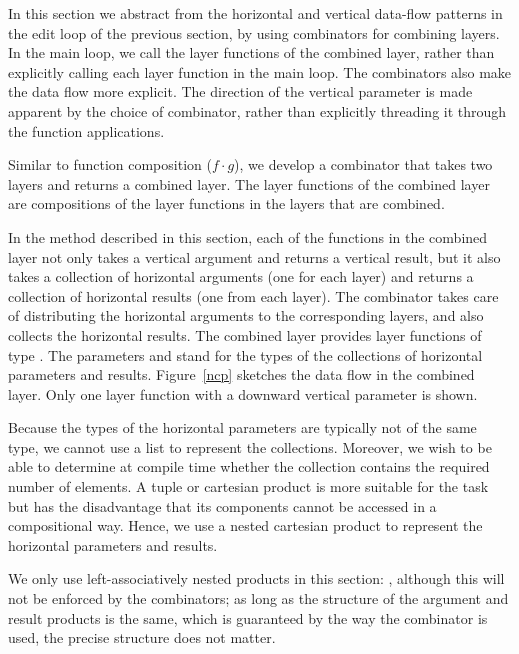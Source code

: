 \documentclass[preprint,natbib]{sigplanconf}
\begin{document}
In this section we abstract from the horizontal and vertical data-flow patterns in the edit loop of the previous section, by using combinators for combining layers. In the main loop, we call the layer functions of the combined layer, rather than explicitly calling each layer function in the main loop. The combinators also make the data flow more explicit. The direction of the vertical parameter is made apparent by the choice of combinator, rather than explicitly threading it through the function applications.

Similar to function composition ($f \cdot g$), we develop a  combinator that takes two layers and returns a combined layer. The layer functions of the combined layer are compositions of the layer functions in the layers that are combined.

In the method described in this section, each of the functions in the combined layer not only takes a vertical argument and returns a vertical result, but it also takes a collection of horizontal arguments (one for each layer) and returns a collection of horizontal results (one from each layer). The  combinator takes care of distributing the horizontal arguments to the corresponding layers, and also collects the horizontal results. The combined layer provides layer functions of type . The parameters  and  stand for the types of the collections of horizontal parameters and results. Figure~\ref{ncp} sketches the data flow in the combined layer. Only one layer function with a downward vertical parameter is shown.

Because the types of the horizontal parameters are typically not of the same type, we cannot use a list to represent the collections. Moreover, we wish to be able to determine at compile time whether the collection contains the required number of elements. A tuple or cartesian product is more suitable for the task but has the disadvantage that its components cannot be accessed in a compositional way. Hence, we use a nested cartesian product to represent the horizontal parameters and results. 

We only use left-associatively nested products in this section: 
, although this will not be enforced by the combinators; as long as the structure of the argument and result products is the same, which is guaranteed by the way the  combinator is used, the precise structure does not matter.
\end{document}
